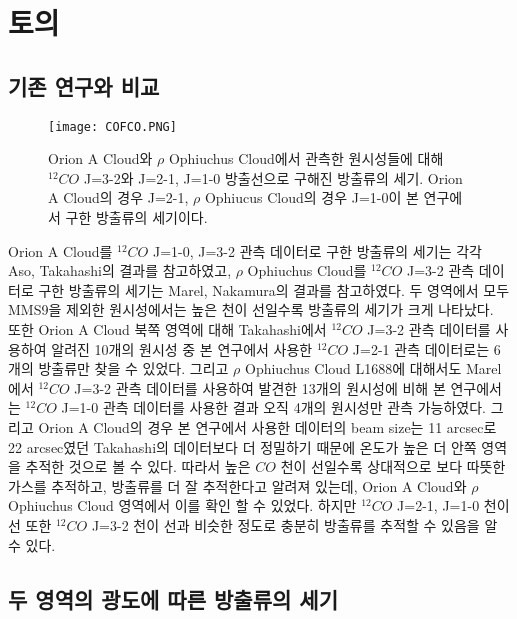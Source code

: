 \section{토의}

\subsection{기존 연구와 비교}

\begin{figure}[h]
	\begin{center}
		\texttt{[image: COFCO.PNG]}
	\end{center}
	\caption{Orion A Cloud와 $\rho$ Ophiuchus Cloud에서 관측한 원시성들에 대해 $^{12}CO$ J=3-2와 J=2-1, J=1-0 방출선으로 구해진 방출류의 세기. Orion A Cloud의 경우 J=2-1, $\rho$ Ophiucus Cloud의 경우 J=1-0이 본 연구에서 구한 방출류의 세기이다.}
\end{figure}

Orion A Cloud를 $^{12}CO$ J=1-0, J=3-2 관측 데이터로 구한 방출류의 세기는 각각 Aso, Takahashi의 결과를 참고하였고, $\rho$ Ophiuchus Cloud를 $^{12}CO$ J=3-2 관측 데이터로 구한 방출류의 세기는 Marel, Nakamura의 결과를 참고하였다.\cite{Aso}\cite{Takahashi}\cite{Marel}\cite{Nakamura} 두 영역에서 모두 MMS9을 제외한 원시성에서는 높은 천이 선일수록 방출류의 세기가 크게 나타났다.
\\
또한 Orion A Cloud 북쪽 영역에 대해 Takahashi에서 $^{12}CO$ J=3-2 관측 데이터를 사용하여 알려진 10개의 원시성 중 본 연구에서 사용한 $^{12}CO$ J=2-1 관측 데이터로는 6개의 방출류만 찾을 수 있었다. 그리고 $\rho$ Ophiuchus Cloud L1688에 대해서도 Marel에서 $^{12}CO$ J=3-2 관측 데이터를 사용하여 발견한 13개의 원시성에 비해 본 연구에서는 $^{12}CO$ J=1-0 관측 데이터를 사용한 결과 오직 4개의 원시성만 관측 가능하였다.\cite{Takahashi}\cite{Marel} 그리고 Orion A Cloud의 경우 본 연구에서 사용한 데이터의 beam size는 11 arcsec로 22 arcsec였던 Takahashi의 데이터보다 더 정밀하기 때문에 온도가 높은 더 안쪽 영역을 추적한 것으로 볼 수 있다. 따라서 높은 $CO$ 천이 선일수록 상대적으로 보다 따뜻한 가스를 추적하고, 방출류를 더 잘 추적한다고 알려져 있는데, Orion A Cloud와 $\rho$ Ophiuchus Cloud 영역에서 이를 확인 할 수 있었다. 하지만 $^{12}CO$ J=2-1, J=1-0 천이 선 또한 $^{12}CO$ J=3-2 천이 선과 비슷한 정도로 충분히 방출류를 추적할 수 있음을 알 수 있다.


\subsection{두 영역의 광도에 따른 방출류의 세기}

